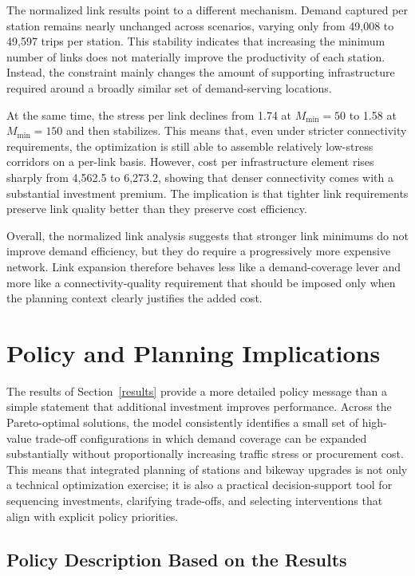 \documentclass[preprint,authoryear,10pt]{elsarticle}
\begin{document}
The normalized link results point to a different mechanism. Demand captured per station remains nearly unchanged across scenarios, varying only from 49,008 to 49,597 trips per station. This stability indicates that increasing the minimum number of links does not materially improve the productivity of each station. Instead, the constraint mainly changes the amount of supporting infrastructure required around a broadly similar set of demand-serving locations.

At the same time, the stress per link declines from 1.74 at $M_{\min}=50$ to 1.58 at $M_{\min}=150$ and then stabilizes. This means that, even under stricter connectivity requirements, the optimization is still able to assemble relatively low-stress corridors on a per-link basis. However, cost per infrastructure element rises sharply from 4,562.5 to 6,273.2, showing that denser connectivity comes with a substantial investment premium. The implication is that tighter link requirements preserve link quality better than they preserve cost efficiency.

Overall, the normalized link analysis suggests that stronger link minimums do not improve demand efficiency, but they do require a progressively more expensive network. Link expansion therefore behaves less like a demand-coverage lever and more like a connectivity-quality requirement that should be imposed only when the planning context clearly justifies the added cost.

\section{Policy and Planning Implications}
\label{policy}

The results of Section~\ref{results} provide a more detailed policy message than a simple statement that additional investment improves performance. Across the Pareto-optimal solutions, the model consistently identifies a small set of high-value trade-off configurations in which demand coverage can be expanded substantially without proportionally increasing traffic stress or procurement cost. This means that integrated planning of stations and bikeway upgrades is not only a technical optimization exercise; it is also a practical decision-support tool for sequencing investments, clarifying trade-offs, and selecting interventions that align with explicit policy priorities.

\subsection{Policy Description Based on the Results}
\end{document}
